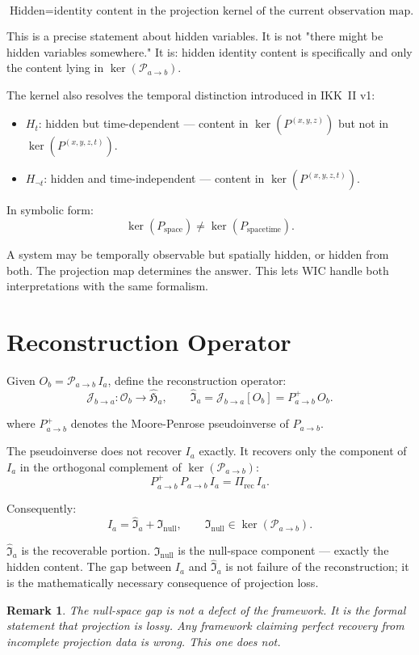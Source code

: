 \documentclass[11pt,a4paper,oneside]{article}
\newtheorem{remark}{Remark}[section]
\newcommand{\Ia}{I_a}
\newcommand{\Inull}{\mathfrak{I}_{\mathrm{null}}}
\newcommand{\Ihat}{\widehat{\mathfrak{I}}_a}
\newcommand{\Hahat}{\widehat{\mathfrak{H}}_a}
\newcommand{\Osp}{\mathcal{O}_b}
\newcommand{\Pab}{\mathcal{P}_{a\to b}}
\newcommand{\Ppinv}{P_{a\to b}^{+}}
\newcommand{\Jba}{\mathcal{J}_{b\to a}}
\begin{document}
\[
\boxed{\text{Hidden} = \text{identity content in the projection kernel of the current observation map.}}
\]

This is a precise statement about hidden variables. It is not "there might be hidden variables somewhere." It is: hidden identity content is specifically and only the content lying in $\ker(\Pab)$.

The kernel also resolves the temporal distinction introduced in IKK~II v1:

\begin{itemize}
\item $H_t$: hidden but time-dependent --- content in $\ker(P^{(x,y,z)})$ but not in $\ker(P^{(x,y,z,t)})$.
\item $H_{\neg t}$: hidden and time-independent --- content in $\ker(P^{(x,y,z,t)})$.
\end{itemize}

In symbolic form:
\[
\ker(P_{\mathrm{space}}) \neq \ker(P_{\mathrm{spacetime}}).
\]

A system may be temporally observable but spatially hidden, or hidden from both. The projection map determines the answer. This lets WIC handle both interpretations with the same formalism.

\section{Reconstruction Operator}

Given $O_b = \Pab\,\Ia$, define the reconstruction operator:
\[
\Jba : \Osp \longrightarrow \Hahat,\qquad \Ihat = \Jba[O_b] = \Ppinv\,O_b.
\]

where $\Ppinv$ denotes the Moore-Penrose pseudoinverse of $P_{a\to b}$.

The pseudoinverse does not recover $\Ia$ exactly. It recovers only the component of $\Ia$ in the orthogonal complement of $\ker(\Pab)$:
\[
\Ppinv\,P_{a\to b}\,\Ia = \Pi_{\mathrm{rec}}\,\Ia.
\]

Consequently:
\[
\boxed{\Ia = \Ihat + \Inull,\qquad \Inull \in \ker(\Pab).}
\]

$\Ihat$ is the recoverable portion. $\Inull$ is the null-space component --- exactly the hidden content. The gap between $\Ia$ and $\Ihat$ is not failure of the reconstruction; it is the mathematically necessary consequence of projection loss.

\begin{remark}
The null-space gap is not a defect of the framework. It is the formal statement that projection is lossy. Any framework claiming perfect recovery from incomplete projection data is wrong. This one does not.
\end{remark}
\end{document}
